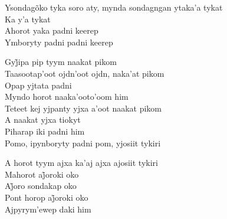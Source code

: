  \smallskip
 \begin{center}\end{center}
 \smallskip
 
\noindent   Ysondagõko tyka soro aty, mynda sondagngan ytaka'a tykat\\
  Ka y'a tykat\\
  Ahorot yaka padni keerep\\
  Ymboryty padni padni keerep
 
 \smallskip
 \begin{center}\end{center}
 \smallskip
 
\noindent   Gyj̃ipa pip tyym naakat pikom\\
  Taasootap'oot ojdn'oot ojdn, naka'at pikom\\
  Opap yjtata padni\\
  Myndo horot naaka'ooto'oom him\\
  Teteet kej yjpanty yjxa a'oot naakat pikom\\
  A naakat yjxa tiokyt\\
  Piharap iki padni him\\
  Pomo, ipynboryty padni pom, yjosiit tykiri
 
 \smallskip
 \begin{center}\end{center}
 \smallskip
 
\noindent   A horot tyym ajxa ka'aj ajxa ajosiit tykiri\\
  Mahorot aj̃oroki oko\\
  Aj̃oro sondakap oko\\
  Pont horop aj̃oroki oko\\
  Ajpyrym'ewep daki him
 

